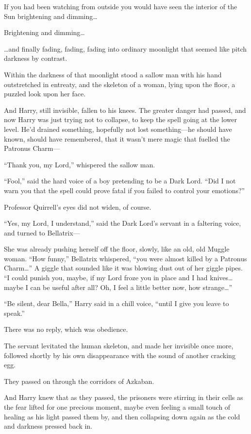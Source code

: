If you had been watching from outside you would have seen the interior
of the Sun brightening and dimming\ldots{}

Brightening and dimming\ldots{}

\ldots{}and finally fading, fading, fading into ordinary moonlight that
seemed like pitch darkness by contrast.

Within the darkness of that moonlight stood a sallow man with his hand
outstretched in entreaty, and the skeleton of a woman, lying upon the
floor, a puzzled look upon her face.

And Harry, still invisible, fallen to his knees. The greater danger had
passed, and now Harry was just trying not to collapse, to keep the spell
going at the lower level. He'd drained something, hopefully not lost
something---he should have known, should have remembered, that it wasn't
mere magic that fuelled the Patronus Charm---

``Thank you, my Lord,'' whispered the sallow man.

``Fool,'' said the hard voice of a boy pretending to be a Dark Lord.
``Did I not warn you that the spell could prove fatal if you failed to
control your emotions?''

Professor Quirrell's eyes did not widen, of course.

``Yes, my Lord, I understand,'' said the Dark Lord's servant in a
faltering voice, and turned to Bellatrix---

She was already pushing herself off the floor, slowly, like an old, old
Muggle woman. ``How funny,'' Bellatrix whispered, ``you were almost
killed by a Patronus Charm\ldots{}'' A giggle that sounded like it was
blowing dust out of her giggle pipes. ``I could punish you, maybe, if my
Lord froze you in place and I had knives\ldots{} maybe I can be useful
after all? Oh, I feel a little better now, how strange\ldots{}''

``Be silent, dear Bella,'' Harry said in a chill voice, ``until I give
you leave to speak.''

There was no reply, which was obedience.

The servant levitated the human skeleton, and made her invisible once
more, followed shortly by his own disappearance with the sound of
another cracking egg.

They passed on through the corridors of Azkaban.

And Harry knew that as they passed, the prisoners were stirring in their
cells as the fear lifted for one precious moment, maybe even feeling a
small touch of healing as his light passed them by, and then collapsing
down again as the cold and darkness pressed back in.

